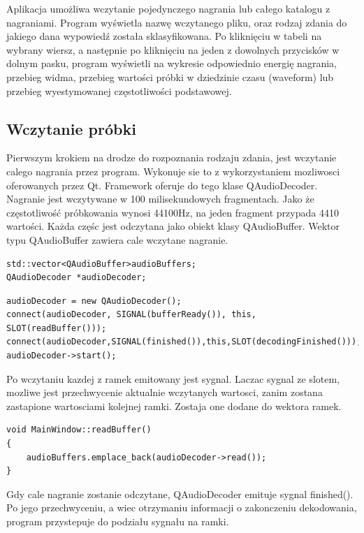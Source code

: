 \documentclass[a4paper,12 pt]{article}
\begin{document}
Aplikacja umożliwa wczytanie pojedynczego nagrania lub całego katalogu z nagraniami. Program wyświetla nazwę wczytanego pliku, oraz rodzaj zdania do jakiego dana wypowiedź została sklasyfikowana. Po kliknięciu w tabeli na wybrany wiersz, a następnie po kliknięciu na jeden z dowolnych przycisków w dolnym pasku, program wyświetli na wykresie odpowiednio energię nagrania, przebieg widma, przebieg wartości próbki w dziedzinie czasu (waveform) lub przebieg wyestymowanej częstotliwości podstawowej.
\subsection{Wczytanie próbki}
Pierwszym krokiem na drodze do rozpoznania rodzaju zdania, jest wczytanie calego nagrania przez program. Wykonuje sie to z wykorzystaniem mozliwosci oferowanych przez Qt. Framework oferuje do tego klase QAudioDecoder. 
Nagranie jest wczytywane w 100 milisekundowych fragmentach. Jako że częstotliwość próbkowania wynosi 44100Hz, na jeden fragment przypada 4410 wartości. Każda częśc jest odczytana jako obiekt klasy QAudioBuffer. Wektor typu QAudioBuffer zawiera cale wczytane nagranie.
\begin{lstlisting}
std::vector<QAudioBuffer>audioBuffers;
QAudioDecoder *audioDecoder;
\end{lstlisting}
\begin{lstlisting}
audioDecoder = new QAudioDecoder();
connect(audioDecoder, SIGNAL(bufferReady()), this, SLOT(readBuffer()));
connect(audioDecoder,SIGNAL(finished()),this,SLOT(decodingFinished()));
audioDecoder->start();
\end{lstlisting}
Po wczytaniu kazdej z ramek emitowany jest sygnal. Laczac sygnal ze slotem, mozliwe jest przechwycenie aktualnie wczytanych wartosci, zanim zostana zastapione wartosciami kolejnej ramki.
Zostaja one dodane do wektora ramek.
\begin{lstlisting}
void MainWindow::readBuffer()
{
    audioBuffers.emplace_back(audioDecoder->read());
}
\end{lstlisting}
Gdy cale nagranie zostanie odczytane, QAudioDecoder emituje sygnal finished(). Po jego przechwyceniu, a wiec otrzymaniu informacji o zakonczeniu dekodowania, program przystepuje do podziału sygnału na ramki.
\end{document}
